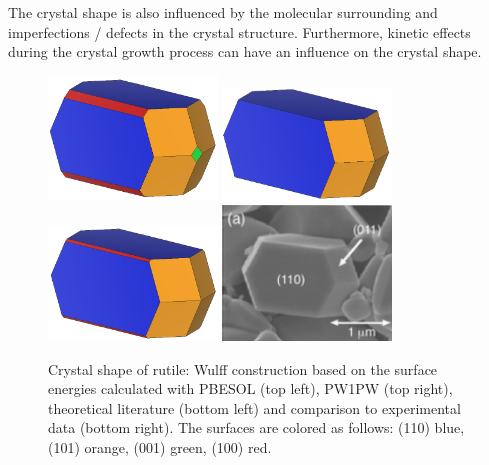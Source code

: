 \documentclass[a4paper,12pt,parskip=half]{scrartcl}
\begin{document}
The crystal shape is also influenced by the molecular surrounding and imperfections / defects in the crystal structure. Furthermore, kinetic effects during the crystal growth process can have an influence on the crystal shape.
%
\begin{figure}[H]
	\centering
	\includegraphics[width=0.4\textwidth]{w_pbesol.png}
	\includegraphics[width=0.4\textwidth]{w_pw1pw.png}
	\includegraphics[width=0.4\textwidth]{w_lit.png}
	\includegraphics[width=0.4\textwidth]{rutile_exp.png}
	\caption{Crystal shape of rutile: Wulff construction based on the surface energies calculated with PBESOL (top left), PW1PW (top right), theoretical literature\autocite[]{rutile-surface-energy} (bottom left) and comparison to experimental data\autocite[]{rutile-shape} (bottom right). The surfaces are colored as follows: (110) blue, (101) orange, (001) green, (100) red.}
	\label{fig:wulff}
\end{figure}
%
\newpage
\printbibliography[title={Literature}]
%
\end{document}
